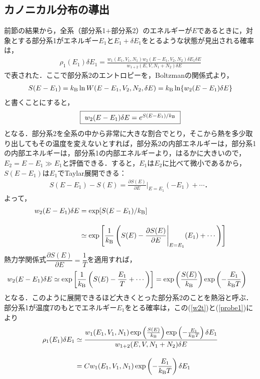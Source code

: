 \subsection{カノニカル分布の導出}
前節の結果から，全系（部分系1$+$部分系2）のエネルギーが$E$であるときに，対象とする部分系1がエネルギー$E_1$と$E_1+\delta E_1$をとるような状態が見出される確率は，
\begin{align}
\label{probe1}
\rho_1(E_1)\delta E_1
=\frac{w_1(E_1,V_1,N_1)w_2(E-E_1,V_2,N_2)\delta E_1\delta E}{w_{1+2}(E,V,N_1+N_2)\delta E}
\end{align}
で表された．ここで部分系2のエントロピーを，Boltzmanの関係式より，
\begin{align}
S(E-E_1)=k_{\rm B}\ln W(E-E_1,V_2,N_2,\delta E)=k_{\rm B}\ln \{w_2(E-E_1)\delta E\}
\end{align}
と書くことにすると，
\begin{align}
\fbox{
$w_2(E-E_1)\delta E=e^{S(E-E_1)/k_{\rm B}}$
}
\end{align}
となる．部分系2を全系の中から非常に大きな割合でとり，そこから熱を多少取り出してもその温度を変えないとすれば，部分系2の内部エネルギーは，部分系1の内部エネルギーは，部分系1の内部エネルギーより，はるかに大きいので，$E_2=E-E_1\gg E_1$と評価できる．すると，$E_1$は$E_2$に比べて微小であるから，$S(E-E_1)$は$E_1$でTaylar展開できる：
\begin{align}\label{stay1}
S(E-E_1)-S(E)=\frac{\partial S(E)}{\partial E}\Biggr|_{E=E_1}(-E_1)+\cdots．
  \end{align}
よって，
\begin{align}
w_2(E-E_1)\delta E&=\exp[{S(E-E_1)/k_{\rm B}}]\notag\\[10pt]
&\simeq\exp
\left[\frac{1}{k_{\rm B}}
\left(
S(E)-\frac{\partial S(E)}{\partial E}\Biggr|_{E=E_1}(E_1)+\cdots
\right)
\right]
  \end{align}
熱力学関係式$\dfrac{\partial S(E)}{\partial E}=\dfrac{1}{T}$を適用すれば，
\begin{align}
\label{w2t}
w_2(E-E_1)\delta E
&\simeq\exp
\left[\frac{1}{k_{\rm B}}
\left(
S(E)-\frac{E_1}{T}+\cdots
\right)
\right]
=\exp\left(
\frac{S(E)}{k_{\rm B}}
\right)
\exp\left(
-\frac{E_1}{k_{\rm B}T}
\right)
  \end{align}
となる．このように展開できるほど大きくとった部分系2のことを熱浴と呼ぶ．部分系1が温度$T$のもとでエネルギー$E_1$をとる確率は，この(\ref{w2t})と(\ref{probe1})により
\begin{align}
\label{probe12}
\rho_1(E_1)\delta E_1
&\simeq\frac{w_1(E_1,V_1,N_1)\exp\left(
\frac{S(E)}{k_{\rm B}}
\right)
\exp\left(
-\frac{E_1}{k_{\rm B}T}
\right)\delta E_1}{w_{1+2}(E,V,N_1+N_2)\delta E}\notag\\[10pt]
%
&=Cw_1(E_1,V_1,N_1)
\exp\left(
-\frac{E_1}{k_{\rm B}T}
\right)\delta E_1
\end{align}
